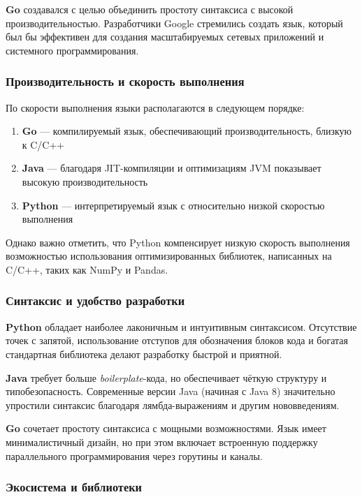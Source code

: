\textbf{Go} создавался с целью объединить простоту синтаксиса с высокой производительностью. Разработчики Google стремились создать язык, который был бы эффективен для создания масштабируемых сетевых приложений и системного программирования.

\subsubsection*{Производительность и скорость выполнения}

По скорости выполнения языки располагаются в следующем порядке:

\begin{enumerate}
    \item \textbf{Go} --- компилируемый язык, обеспечивающий производительность, близкую к C/C++
    \item \textbf{Java} --- благодаря JIT-компиляции и оптимизациям JVM показывает высокую производительность
    \item \textbf{Python} --- интерпретируемый язык с относительно низкой скоростью выполнения
\end{enumerate}

Однако важно отметить, что Python компенсирует низкую скорость выполнения возможностью использования оптимизированных библиотек, написанных на C/C++, таких как NumPy и Pandas.

\subsubsection*{Синтаксис и удобство разработки}

\textbf{Python} обладает наиболее лаконичным и интуитивным синтаксисом. Отсутствие точек с запятой, использование отступов для обозначения блоков кода и богатая стандартная библиотека делают разработку быстрой и приятной.

\textbf{Java} требует больше \textit{boilerplate}-кода, но обеспечивает чёткую структуру и типобезопасность. Современные версии Java (начиная с Java 8) значительно упростили синтаксис благодаря лямбда-выражениям и другим нововведениям.

\textbf{Go} сочетает простоту синтаксиса с мощными возможностями. Язык имеет минималистичный дизайн, но при этом включает встроенную поддержку параллельного программирования через горутины и каналы.

\subsubsection*{Экосистема и библиотеки}


